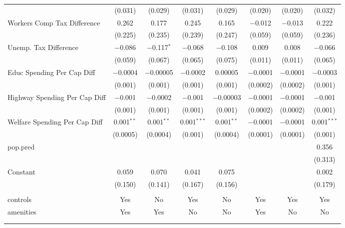 \begin{table}[!htbp]
\begin{tabular}{@{\extracolsep{5pt}}lccccccc}
  & (0.031) & (0.029) & (0.031) & (0.029) & (0.020) & (0.020) & (0.032) \\ 
  Workers Comp Tax Difference & 0.262 & 0.177 & 0.245 & 0.165 & $-$0.012 & $-$0.013 & 0.222 \\ 
  & (0.225) & (0.235) & (0.239) & (0.247) & (0.059) & (0.059) & (0.236) \\ 
  Unemp. Tax Difference & $-$0.086 & $-$0.117$^{*}$ & $-$0.068 & $-$0.108 & 0.009 & 0.008 & $-$0.066 \\ 
  & (0.059) & (0.067) & (0.065) & (0.075) & (0.011) & (0.011) & (0.065) \\ 
  Educ Spending Per Cap Diff & $-$0.0004 & $-$0.00005 & $-$0.0002 & 0.00005 & $-$0.0001 & $-$0.0001 & $-$0.0003 \\ 
  & (0.001) & (0.001) & (0.001) & (0.001) & (0.0002) & (0.0002) & (0.001) \\ 
  Highway Spending Per Cap Diff & $-$0.001 & $-$0.0002 & $-$0.001 & $-$0.00003 & $-$0.0001 & $-$0.0001 & $-$0.001 \\ 
  & (0.001) & (0.001) & (0.001) & (0.001) & (0.0002) & (0.0002) & (0.001) \\ 
  Welfare Spending Per Cap Diff & 0.001$^{**}$ & 0.001$^{**}$ & 0.001$^{***}$ & 0.001$^{**}$ & $-$0.0001 & $-$0.0001 & 0.001$^{***}$ \\ 
  & (0.0005) & (0.0004) & (0.001) & (0.0004) & (0.0001) & (0.0001) & (0.001) \\ 
  pop.pred &  &  &  &  &  &  & 0.356 \\ 
  &  &  &  &  &  &  & (0.313) \\ 
  Constant & 0.059 & 0.070 & 0.041 & 0.075 &  &  & 0.002 \\ 
  & (0.150) & (0.141) & (0.167) & (0.156) &  &  & (0.179) \\ 
 \hline \\[-1.8ex] 
controls & Yes & No & Yes & No & Yes & Yes & Yes \\ 
amenities & Yes & Yes & No & No & Yes & No & No \\ 
\hline \\[-1.8ex] 
\hline 
\hline \\[-1.8ex] 
\end{tabular} 
\end{table} 
